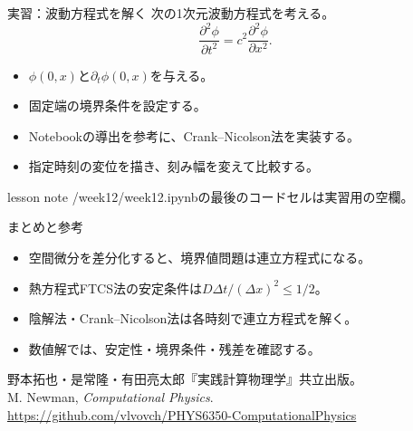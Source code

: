 \documentclass[12pt,aspectratio=43]{beamer}
\newcommand{\code}[1]{{\codefont #1}}
\newenvironment{lessonbox}
  {\begin{beamercolorbox}[wd=\linewidth,sep=1.5mm]{lesson note}}
  {\end{beamercolorbox}\par}
\begin{document}
\begin{frame}[t]{実習：波動方程式を解く}
  次の1次元波動方程式を考える。
  \[
    \frac{\partial^2\phi}{\partial t^2}
    =c^2\frac{\partial^2\phi}{\partial x^2}.
  \]
  \begin{itemize}
    \item \(\phi(0,x)\)と\(\partial_t\phi(0,x)\)を与える。
    \item 固定端の境界条件を設定する。
    \item Notebookの導出を参考に、Crank--Nicolson法を実装する。
    \item 指定時刻の変位を描き、刻み幅を変えて比較する。
  \end{itemize}
  \vfill
  \begin{lessonbox}
    \code{2026/week12/week12.ipynb}の最後のコードセルは実習用の空欄。
  \end{lessonbox}
\end{frame}

\begin{frame}[t]{まとめと参考}
  \begin{itemize}
    \item 空間微分を差分化すると、境界値問題は連立方程式になる。
    \item 熱方程式FTCS法の安定条件は\(D\Delta t/(\Delta x)^2\leq1/2\)。
    \item 陰解法・Crank--Nicolson法は各時刻で連立方程式を解く。
    \item 数値解では、安定性・境界条件・残差を確認する。
  \end{itemize}
  \vfill
  {\footnotesize
    野本拓也・是常隆・有田亮太郎『実践計算物理学』共立出版。\\
    M. Newman, \emph{Computational Physics}.\\
    \url{https://github.com/vlvovch/PHYS6350-ComputationalPhysics}}
\end{frame}
\end{document}
